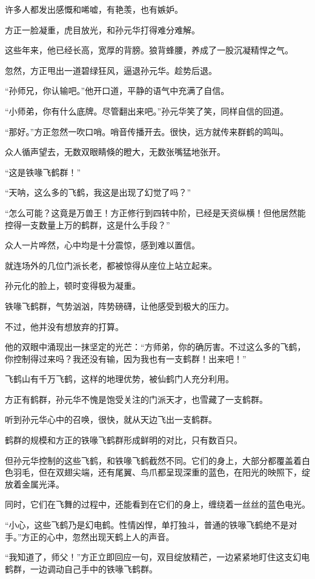 \begin{this_body}
许多人都发出感慨和唏嘘，有艳羡，也有嫉妒。

方正一脸凝重，虎目放光，和孙元华打得难分难解。

这些年来，他已经长高，宽厚的背膀。狼背蜂腰，养成了一股沉凝精悍之气。

忽然，方正甩出一道碧绿狂风，逼退孙元华。趁势后退。

“孙师兄，你认输吧。”他开口道，平静的语气中充满了自信。

“小师弟，你有什么底牌。尽管翻出来吧。”孙元华笑了笑，同样自信的回道。

“那好。”方正忽然一吹口哨。哨音传播开去。很快，远方就传来群鹤的鸣叫。

众人循声望去，无数双眼睛倏的瞪大，无数张嘴猛地张开。

“这是铁喙飞鹤群！”

“天呐，这么多的飞鹤，我这是出现了幻觉了吗？”

“怎么可能？这竟是万兽王！方正修行到四转中阶，已经是天资纵横！但他居然能控得一支数量上万的鹤群，这是什么手段？”

众人一片哗然，心中均是十分震惊，感到难以置信。

就连场外的几位门派长老，都被惊得从座位上站立起来。

孙元化的脸上，顿时变得极为凝重。

铁喙飞鹤群，气势汹汹，阵势磅礴，让他感受到极大的压力。

不过，他并没有想放弃的打算。

他的双眼中涌现出一抹坚定的光芒：“方师弟，你的确厉害。不过这么多的飞鹤，你控制得过来吗？我还没有输，因为我也有一支鹤群！出来吧！”

飞鹤山有千万飞鹤，这样的地理优势，被仙鹤门人充分利用。

方正有鹤群，孙元华不愧是饱受关注的门派天才，也雪藏了一支鹤群。

听到孙元华心中的召唤，很快，就从天边飞出一支鹤群。

鹤群的规模和方正的铁喙飞鹤群形成鲜明的对比，只有数百只。

但孙元华控制的这些飞鹤，和铁喙飞鹤截然不同。它们的身上，大部分都覆盖着白色羽毛，但在双翅尖端，还有尾翼、鸟爪都呈现深重的蓝色，在阳光的映照下，绽放着金属光泽。

同时，它们在飞舞的过程中，还能看到在它们的身上，缠绕着一丝丝的蓝色电光。

“小心，这些飞鹤乃是幻电鹤。性情凶悍，单打独斗，普通的铁喙飞鹤绝不是对手。”方正的心中，忽然出现天鹤上人的声音。

“我知道了，师父！”方正立即回应一句，双目绽放精芒，一边紧紧地盯住这支幻电鹤群，一边调动自己手中的铁喙飞鹤群。


\end{this_body}
